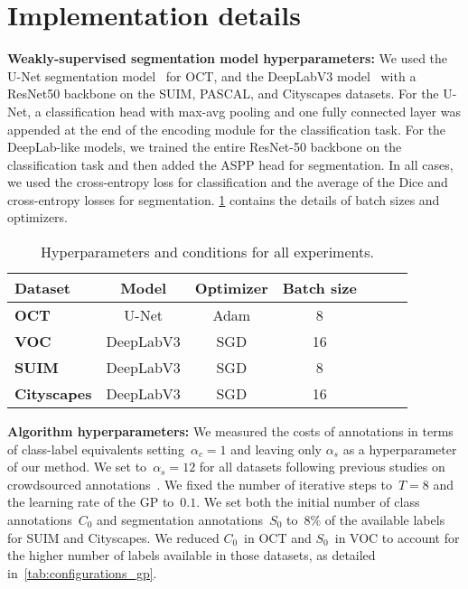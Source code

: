 \section{Implementation details}
\label{sec:impl}
{\bf Weakly-supervised segmentation model hyperparameters: }
We used the U-Net segmentation model~\cite{ronneberger2015u} for OCT, and the DeepLabV3 model~\cite{chen2017rethinking} with a ResNet50 backbone on the SUIM, PASCAL, and Cityscapes datasets. For the U-Net, a classification head with max-avg pooling and one fully connected layer was appended at the end of the encoding module for the classification task. For the DeepLab-like models, we trained the entire ResNet-50 backbone on the classification task and then added the ASPP head for segmentation. In all cases, we used the cross-entropy loss for classification and the average of the Dice and cross-entropy losses for segmentation. \cref{tab:configurations_model} contains the details of batch sizes and optimizers.

\begin{table}[h]
\centering
\begin{tabular}{lcccccc}
\toprule
\textbf{Dataset} & \textbf{Model} &  \textbf{Optimizer} & \textbf{Batch size} \\ \midrule
\textbf{OCT} & U-Net &  Adam & 8  \\
\textbf{VOC} & DeepLabV3 &  SGD & 16 \\
\textbf{SUIM} & DeepLabV3 &  SGD & 8  \\ 
\textbf{Cityscapes} & DeepLabV3 & SGD & 16   \\ \bottomrule
\end{tabular}
\caption{Hyperparameters and conditions for all experiments.}
\label{tab:configurations_model}
\end{table}

{\bf Algorithm hyperparameters: }
We measured the costs of annotations in terms of class-label equivalents setting~$\alpha_c=1$ and leaving only $\alpha_s$ as a hyperparameter of our method. We set to~$\alpha_s=12$ for all datasets following previous studies on crowdsourced annotations~\cite{Bearman16}. We fixed the number of iterative steps to~$T=8$ and the learning rate of the GP to~$0.1$. We set both the initial number of class annotations~$C_0$ and segmentation annotations~$S_0$ to~$8\%$ of the available labels for SUIM and Cityscapes. We reduced $C_0$~in OCT and $S_0$~in VOC to account for the higher number of labels available in those datasets, as detailed in~\cref{tab:configurations_gp}.

